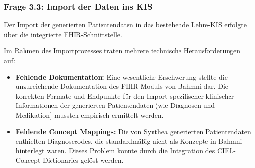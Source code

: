\subsubsection{Frage 3.3: Import der Daten ins KIS}

\begin{description}[style=nextline, font=\bfseries]

    \item[Methodik] 
    Der Import der generierten Patientendaten in das bestehende Lehre-KIS erfolgte über die integrierte FHIR-Schnittstelle.

    \item[Hürden] 
    Im Rahmen des Importprozesses traten mehrere technische Herausforderungen auf:
    
    \begin{itemize}[leftmargin=1.5em, labelsep=0.5em, itemsep=4pt, topsep=4pt]
        \item \textbf{Fehlende Dokumentation:} Eine wesentliche Erschwerung stellte die unzureichende Dokumentation des FHIR-Moduls von Bahmni dar. Die korrekten Formate und Endpunkte für den Import spezifischer klinischer Informationen der generierten Patientendaten (wie Diagnosen und Medikation) mussten empirisch ermittelt werden.
        
        \item \textbf{Fehlende Concept Mappings:} Die von Synthea generierten Patientendaten enthielten Diagnosecodes, die standardmäßig nicht als Konzepte in Bahmni hinterlegt waren. Dieses Problem konnte durch die Integration des CIEL-Concept-Dictionaries gelöst werden.
        

\end{itemize}
\end{description}

